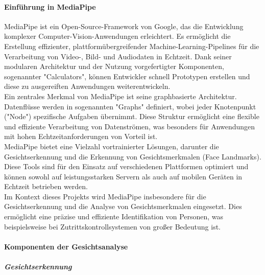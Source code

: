 \paragraph{Einführung in MediaPipe}
MediaPipe ist ein Open-Source-Framework von Google, das die Entwicklung komplexer Computer-Vision-Anwendungen erleichtert. Es ermöglicht die Erstellung effizienter, plattformübergreifender Machine-Learning-Pipelines für die Verarbeitung von Video-, Bild- und Audiodaten in Echtzeit. Dank seiner modularen Architektur und der Nutzung vorgefertigter Komponenten, sogenannter "Calculators", können Entwickler schnell Prototypen erstellen und diese zu ausgereiften Anwendungen weiterentwickeln.  \\
Ein zentrales Merkmal von MediaPipe ist seine graphbasierte Architektur. Datenflüsse werden in sogenannten "Graphs" definiert, wobei jeder Knotenpunkt ("Node") spezifische Aufgaben übernimmt. Diese Struktur ermöglicht eine flexible und effiziente Verarbeitung von Datenströmen, was besonders für Anwendungen mit hohen Echtzeitanforderungen von Vorteil ist.  \\
MediaPipe bietet eine Vielzahl vortrainierter Lösungen, darunter die Gesichtserkennung und die Erkennung von Gesichtsmerkmalen (Face Landmarks). Diese Tools sind für den Einsatz auf verschiedenen Plattformen optimiert und können sowohl auf leistungsstarken Servern als auch auf mobilen Geräten in Echtzeit betrieben werden. \\
Im Kontext dieses Projekts wird MediaPipe insbesondere für die Gesichtserkennung und die Analyse von Gesichtsmerkmalen eingesetzt. Dies ermöglicht eine präzise und effiziente Identifikation von Personen, was beispielsweise bei Zutrittskontrollsystemen von großer Bedeutung ist.\\

\paragraph{Komponenten der Gesichtsanalyse}
\subparagraph{Gesichtserkennung}

